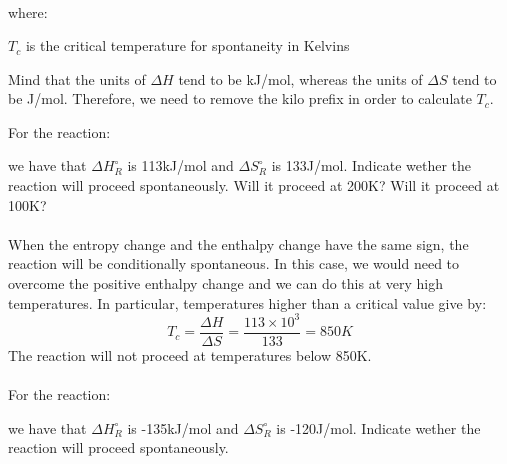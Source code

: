 \documentclass[main.tex]{subfiles}
\newcommand\chapterlabel{entropy}
\begin{document}
\begin{description}
\begin{equation}
\begin{split}
\label{\chapterlabel:equation7}
\end{split}\end{equation}
where:
\begin{where}
 \item $T_c$ is the critical temperature for spontaneity in Kelvins  
 \end{where}
 Mind that the units of $\Delta H$ tend to be kJ/mol, whereas the units of $\Delta S$ tend to be J/mol. Therefore, we need to remove the kilo prefix in order to calculate $T_c$.
\begin{example} %
For the reaction:
\begin{center}\end{center}
we have that $\Delta H_{R}^{\circ}$ is 113kJ/mol and $\Delta S_{R}^{\circ}$ is 133J/mol. Indicate wether the reaction will proceed spontaneously. Will it proceed at 200K? Will it proceed at 100K?\\
\\
When the entropy change and the enthalpy change have the same sign, the reaction will be conditionally spontaneous. In this case, we would need to overcome the positive enthalpy change and we can do this at very high temperatures. In particular, temperatures higher than a critical value give by:
\[T_c  = \frac{\Delta H}{\Delta S} =\frac{113\times 10^3}{133}=850K\]
The reaction will not proceed at temperatures below 850K.\\
\faDiamond\ \\
For the reaction:
\begin{center}\end{center}
we have that $\Delta H_{R}^{\circ}$ is -135kJ/mol and $\Delta S_{R}^{\circ}$ is -120J/mol. Indicate wether the reaction will proceed spontaneously.\\ 
\end{example}%


\end{description}
\end{document}
